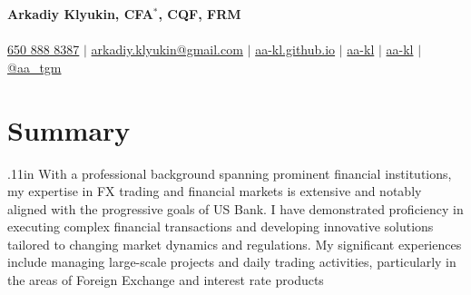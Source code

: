 \documentclass[letterpaper,hidelinks]{article}
\begin{document}
\begin{center}
  \textbf{\Huge{Arkadiy Klyukin, CFA$\mathbb{}^\ast$, CQF, FRM}\\} \\ \vspace{1pt}
  \small
  \faMobile* \hspace{.5pt} \href{tel:+16508888387}{650 888 8387}
  $|$
  \faAt \hspace{.5pt} \href{mailto:arkadiy.klyukin@gmail.com}{arkadiy.klyukin@gmail.com}
  $|$
  \faGlobeAmericas \hspace{.5pt} \href{https://aa-kl.github.io}{aa-kl.github.io}
  $|$
  \faGithub \hspace{.5pt} \href{https://github.com/aa-kl}{aa-kl}
  $|$
  \faLinkedinIn \hspace{.5pt} \href{https://www.linkedin.com/in/aa-kl}{aa-kl}
  $|$
  \faTelegramPlane \hspace{.5pt} \href{https://t.me/aa_tgm}{@aa\_tgm}
\end{center}
\vspace{-27pt}
\section{Summary}
{\hspace{0.1in}
\raggedright{\leftskip.11in
With a professional background spanning prominent financial institutions, my expertise in FX trading and financial markets is extensive and notably aligned with the progressive goals of US Bank. I have demonstrated proficiency in executing complex financial transactions and developing innovative solutions tailored to changing market dynamics and regulations. My significant experiences include managing large-scale projects and daily trading activities, particularly in the areas of Foreign Exchange and interest rate products
    \\}
}
\vspace{-8pt}
\end{document}
